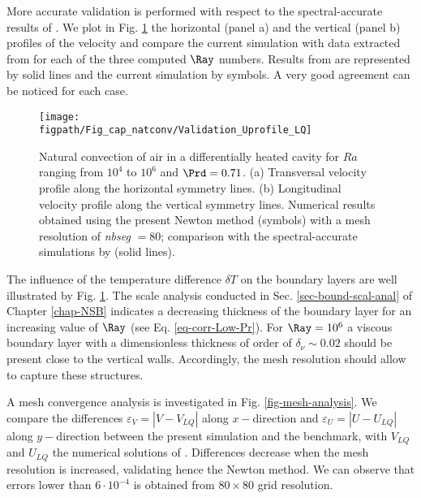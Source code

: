 More accurate validation is performed with respect to the spectral-accurate results of \cite{LeQuere91}.
We plot in Fig. \ref{fig-T1-prof} the horizontal (panel a) and the vertical (panel b)  profiles of the velocity and compare the current simulation with data extracted from  \cite{LeQuere91} for each of the three computed $\Ray$ numbers.
Results from \cite{LeQuere91} are represented by solid lines and the current simulation by symbols.
A very good agreement can  be noticed for each case.

\begin{figure}
	\begin{center}
		\texttt{[image: \\figpath/Fig\_cap\_natconv/Validation\_Uprofile\_LQ]} 
	\end{center}
	\caption{Natural convection of air in a differentially heated cavity for $Ra$ ranging from $10^4$ to $10^6$ and $\Prd = 0.71$. (a) Transversal velocity profile along the  horizontal symmetry lines. (b) Longitudinal velocity profile along the vertical symmetry lines. Numerical results obtained using the present Newton method (symbols) with a mesh resolution of {\em nbseg} $=80$; comparison with the spectral-accurate simulations by \cite{LeQuere91} (solid lines).}
	\label{fig-T1-prof}
\end{figure}

The influence of the temperature difference $\delta T$ on the boundary layers are well illustrated by Fig.  \ref{fig-T1-prof}.
The scale analysis conducted in Sec. \ref{sec-bound-scal-anal} of Chapter \ref{chap-NSB} indicates a decreasing thickness of the boundary layer for an increasing value of $\Ray$ (see Eq. \ref{eq-corr-Low-Pr}). 
For $\Ray = 10^6$ a viscous boundary layer with a dimensionless thickness of order of $\delta_\nu \sim 0.02$ should be present close to the vertical walls.
Accordingly, the mesh resolution should allow to capture these structures.

\noindent A mesh convergence analysis is investigated in Fig. \ref{fig-mesh-analysis}. 
We compare the differences $\varepsilon_V = |V - V_{LQ}|$ along $x-$direction  and $\varepsilon_U = |U - U_{LQ}|$ along $y-$direction between the present simulation and the benchmark, with $V_{LQ}$ and $U_{LQ}$ the numerical solutions of   \cite{LeQuere91}.
Differences decrease when the mesh resolution is increased, validating hence the Newton method.
We can observe that errors lower than $6 \cdot 10^{-4}$ is obtained from $80 \times 80$ grid resolution.


